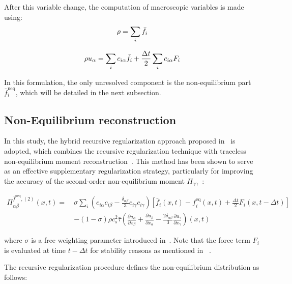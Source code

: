 After this variable change, the computation of macroscopic variables is made using:
\begin{equation}
    \rho = \sum_i \Bar{f}_i
\end{equation}

\begin{equation}
    \rho u_\alpha= \sum_i c_{i\alpha}\Bar{f}_i + \frac{\Delta t}{2}\sum_i c_{i\alpha}F_i
\end{equation}

In this formulation, the only unresolved component is the non-equilibrium part $\bar{f}_i^{\mathrm{neq}}$, which will be detailed in the next subsection.


\subsection{Non-Equilibrium reconstruction}

In this study, the hybrid recursive regularization approach proposed in~\cite{farag2021unified} is adopted, which combines the recursive regularization technique with traceless non-equilibrium moment reconstruction~\cite{farag2020pressure}. This method has been shown to serve as an effective supplementary regularization strategy, particularly for improving the accuracy of the second-order non-equilibrium moment $\Pi_{\gamma\gamma}$~\cite{wissocq2022hydrodynamic}:

\begin{equation}
\begin{aligned}
\Pi_{\alpha\beta}^{\bar{f}^{\text{neq}},(2)}(x,t) =\ 
&\sigma \sum_i \left( c_{i\alpha} c_{i\beta} - \frac{\delta_{\alpha\beta}}{3} c_{i\gamma} c_{i\gamma} \right) 
\left[ \bar{f}_i(x,t) - f_i^{\text{eq}}(x,t) + \frac{\Delta t}{2} F_i(x,t - \Delta t) \right] \\
&- (1 - \sigma) \rho c_s^2 \bar{\tau} \left( 
\frac{\partial u_\alpha}{\partial x_\beta} + \frac{\partial u_\beta}{\partial x_\alpha} 
- \frac{2 \delta_{\alpha\beta}}{3} \frac{\partial u_\gamma}{\partial x_\gamma} 
\right)(x,t)
\end{aligned}
\end{equation}

where $\sigma$ is a free weighting parameter introduced in~\cite{jacob2018new}. Note that the force term $F_i$ is evaluated at time $t - \Delta t$ for stability reasons as mentioned in ~\cite{farag2021unified}.

The recursive regularization procedure defines the non-equilibrium distribution as follows:

